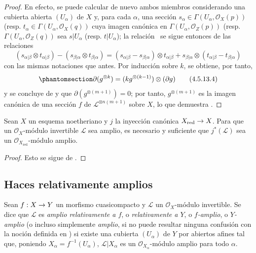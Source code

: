 \documentclass[oneside,10pt]{amsart}
\makeatletter
\newcommand{\ega@arrow}[2]{\mathchoice{#1}{#2}{#2}{#2}}
\renewcommand{\to}{\ega@arrow{\longrightarrow}{\rightarrow}}
\newcommand{\oldpage}[2][]{\marginnote{\normalfont\footnotesize\textbf{#1}~|~#2}\ignorespaces}
\let\EGAOriginalLabel\label
\renewcommand{\label}[1]{\phantomsection\EGAOriginalLabel{#1}}
\makeatother
\begin{document}
\begin{proof}
  En efecto, se puede calcular de nuevo ambos miembros considerando una cubierta abierta $(U_\alpha)$ de $X$ y, para cada $\alpha$, una sección $s_\alpha\in\Gamma(U_\alpha,\mathcal{O}_X(p))$ (resp. $t_\alpha\in\Gamma(U_\alpha,\mathcal{O}_X(q))$ cuya imagen canónica en $\Gamma(U_\alpha,\mathcal{O}_Z(p))$ (resp. $\Gamma(U_\alpha,\mathcal{O}_Z(q))$ sea $s|U_\alpha$ (resp. $t|U_\alpha$);
  la relación~ se sigue entonces de las relaciones
  \[
  (s_{\alpha|\beta}\otimes t_{\alpha|\beta})
  -(s_{\beta|\alpha}\otimes t_{\beta|\alpha})
  =(s_{\alpha|\beta}-s_{\beta|\alpha})\otimes t_{\alpha|\beta}
  +s_{\beta|\alpha}\otimes(t_{\alpha|\beta}-t_{\beta|\alpha})
\]
  con las mismas notaciones que antes.
  Por inducción sobre $k$, se obtiene, por tanto,
  \begin{equation}
\label{II.4.5.13.4-fr}
  \partial(g^{\otimes k})=(kg^{\otimes(k-1)})\otimes(\partial g)
\tag{4.5.13.4}
\end{equation}
\oldpage[II]{89}
  y se concluye de  y  que $\partial(g^{\otimes(m+1)})=0$;
  por tanto, $g^{\otimes(m+1)}$ es la imagen canónica de una sección $f$ de $\mathcal{L}^{\otimes n(m+1)}$ sobre $X$, lo que demuestra .
\end{proof}

\begin{corollary}[4.5.14]
\label{II.4.5.14-fr}
Sean $X$ un esquema noetheriano y $j$ la inyección canónica $X_{\mathrm{red}}\to X$.
Para que un $\mathcal{O}_X$-módulo invertible $\mathcal{L}$ sea amplio, es necesario y suficiente que $j^*(\mathcal{L})$ sea un $\mathcal{O}_{X_{\mathrm{red}}}$-módulo amplio.
\end{corollary}

\begin{proof}
Esto se sigue de .
\end{proof}

\subsection{Haces relativamente amplios}
\label{II.4.6-fr}

\begin{definition}[4.6.1]
\label{II.4.6.1-fr}
Sean $f:X\to Y$ un morfismo cuasicompacto y $\mathcal{L}$ un $\mathcal{O}_X$-módulo invertible.
Se dice que $\mathcal{L}$ es \emph{amplio relativamente a $f$}, o \emph{relativamente a $Y$}, o \emph{$f$-amplio}, o \emph{$Y$-amplio} \textup{(o incluso simplemente \emph{amplio}, si no puede resultar ninguna confusión con la noción definida en )} si existe una cubierta $(U_\alpha)$ de $Y$ por abiertos afines tal que, poniendo $X_\alpha=f^{-1}(U_\alpha)$, $\mathcal{L}|X_\alpha$ es un $\mathcal{O}_{X_\alpha}$-módulo amplio para todo $\alpha$.
\end{definition}
\end{document}
